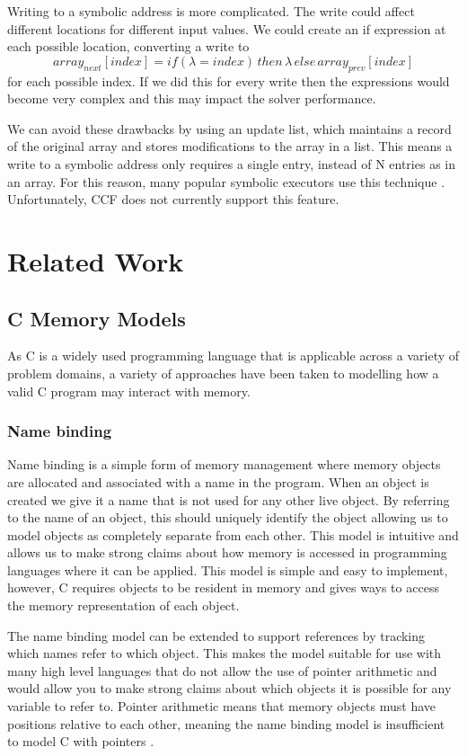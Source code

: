 \documentclass[12pt,twoside]{report}
\begin{document}
Writing to a symbolic address is more complicated. The write could affect different locations for different input values. We could create an if expression at each possible location, converting a write to $$array_{next}[index] = if (\lambda = index) \, then \, \lambda \, else \, array_{prev}[index]$$ for each possible index. If we did this for every write then the expressions would become very complex and this may impact the solver performance.

We can avoid these drawbacks by using an update list, which maintains a record of the original array and stores modifications to the array in a list. This means a write to a symbolic address only requires a single entry, instead of N entries as in an array. For this reason, many popular symbolic executors use this technique \cite{cadar2008klee, cadar2008exe}. Unfortunately, CCF does not currently support this feature.


\chapter{Related Work}
\section{C Memory Models}
As C is a widely used programming language that is applicable across a variety of problem domains, a variety of approaches have been taken to modelling how a valid C program may interact with memory.
\subsection{Name binding}
Name binding is a simple form of memory management where memory objects are allocated and associated with a name in the program. When an object is created we give it a name that is not used for any other live object. By referring to the name of an object, this should uniquely identify the object allowing us to model objects as completely separate from each other. This model is intuitive and allows us to make strong claims about how memory is accessed in programming languages where it can be applied.
This model is simple and easy to implement, however, C requires objects to be resident in memory and gives ways to access the memory representation of each object. 

The name binding model can be extended to support references by tracking which names refer to which object. This makes the model suitable for use with many high level languages that do not allow the use of pointer arithmetic and would allow you to make strong claims about which objects it is possible for any variable to refer to. Pointer arithmetic means that memory objects must have positions relative to each other, meaning the name binding model is insufficient to model C with pointers \cite{xu2010memory}.
\end{document}
